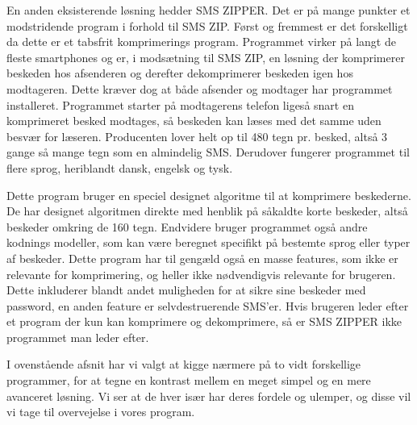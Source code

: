 En anden eksisterende løsning hedder SMS ZIPPER. Det er på mange punkter et modstridende program i forhold til SMS ZIP. Først og fremmest er det forskelligt da dette er et tabsfrit komprimerings program. Programmet virker på langt de fleste smartphones og er, i modsætning til SMS ZIP, en løsning der komprimerer beskeden hos afsenderen og derefter dekomprimerer beskeden igen hos modtageren. Dette kræver dog at både afsender og modtager har programmet installeret. Programmet starter på modtagerens telefon ligeså snart en komprimeret besked modtages, så beskeden kan læses med det samme uden besvær for læseren. Producenten lover helt op til 480 tegn pr. besked, altså 3 gange så mange tegn som en almindelig SMS. Derudover fungerer programmet til flere sprog, heriblandt dansk, engelsk og tysk.

Dette program bruger en speciel designet algoritme til at komprimere beskederne. De har designet algoritmen direkte med henblik på såkaldte korte beskeder, altså beskeder omkring de 160 tegn. Endvidere bruger programmet også andre kodnings modeller, som kan være beregnet specifikt på bestemte sprog eller typer af beskeder. Dette program har til gengæld også en masse features, som ikke er relevante for komprimering, og heller ikke nødvendigvis relevante for brugeren. Dette inkluderer blandt andet muligheden for at sikre sine beskeder med password, en anden feature er selvdestruerende SMS'er. Hvis brugeren leder efter et program der kun kan komprimere og dekomprimere, så er SMS ZIPPER ikke programmet man leder efter.\cite{smszipper} 

I ovenstående afsnit har vi valgt at kigge nærmere på to vidt forskellige programmer, for at tegne en kontrast mellem en meget simpel og en mere avanceret løsning. Vi ser at de hver især har deres fordele og ulemper, og disse vil vi tage til overvejelse i vores program.